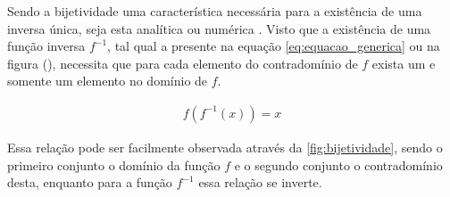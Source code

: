 Sendo a bijetividade uma característica necessária para a existência de uma inversa única, seja esta analítica ou numérica \cite{weisstein}. Visto que a existência de uma função inversa $f^{-1}$, tal qual a presente na equação \ref{eq:equacao_generica} ou na figura (), necessita que para cada elemento do contradomínio de $f$ exista um e somente um elemento no domínio de $f$.

\begin{align}
f(f^{-1}(x)) = x
\label{eq:equacao_generica}
\end{align}


Essa relação pode ser facilmente observada através da \autoref{fig:bijetividade}, sendo o primeiro conjunto o domínio da função $f$ e o segundo conjunto o contradomínio desta, enquanto para a função $f^{-1}$ essa relação se inverte.

